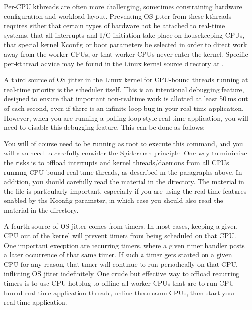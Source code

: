 Per-CPU kthreads are often more challenging, sometimes constraining
hardware configuration and workload layout.
Preventing OS jitter from these kthreads requires either that certain
types of hardware
not be attached to real-time systems, that all interrupts and I/O
initiation take place on housekeeping CPUs, that special kernel
Kconfig or boot parameters be selected in order to direct work away from
the worker CPUs, or that worker CPUs never enter the kernel.
Specific per-kthread advice may be found in the Linux kernel source
 directory at .

A third source of OS jitter in the Linux kernel for CPU-bound threads
running at real-time priority is the scheduler itself.
This is an intentional debugging feature, designed to ensure that
important non-realtime work is allotted at least 50\,ms
out of each second, even if there is an infinite-loop bug in
your real-time application.
However, when you are running a polling-loop-style real-time application,
you will need to disable this debugging feature.
This can be done as follows:

{
	\scriptsize
}

You will of course need to be running as root to execute this command,
and you will also need to carefully consider the Spiderman principle.
One way to minimize the risks is to offload interrupts and
kernel threads/daemons from all CPUs running CPU-bound real-time
threads, as described in the paragraphs above.
In addition, you should carefully read the material in the
 directory.
The material in the  file is particularly
important, especially if you are using the  real-time features
enabled by the  Kconfig parameter, in which
case you should also read the material in the
 directory.

A fourth source of OS jitter comes from timers.
In most cases, keeping a given CPU out of the kernel will prevent
timers from being scheduled on that CPU.
One important execption are recurring timers, where a given timer
handler posts a later occurrence of that same timer.
If such a timer gets started on a given CPU for any reason, that
timer will continue to run periodically on that CPU, inflicting
OS jitter indefinitely.
One crude but effective way to offload recurring timers is to
use CPU hotplug to offline all worker CPUs that are to run CPU-bound
real-time application threads, online these same CPUs, then start
your real-time application.

